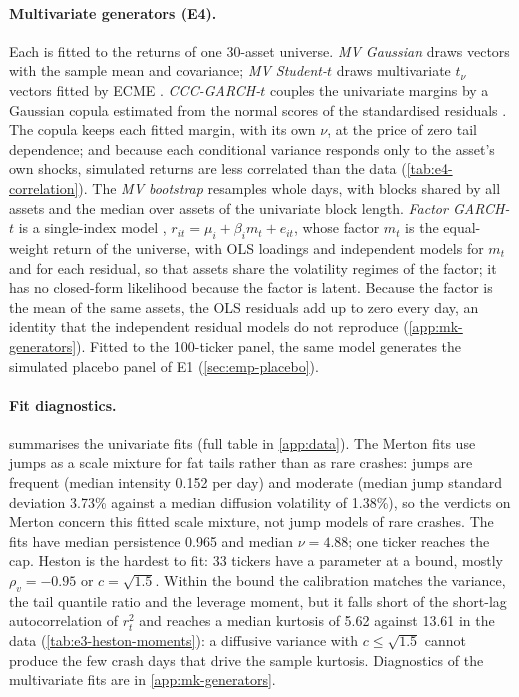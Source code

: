 \paragraph{Multivariate generators (E4).}
Each is fitted to the \TRAIN{} returns of one 30-asset universe. \emph{MV Gaussian} draws \iid{}
vectors with the sample mean and covariance; \emph{MV Student-$t$} draws \iid{} multivariate
$t_\nu$ vectors fitted by ECME \citep{liu1995ml}. \emph{CCC-GARCH-$t$}
\citep{bollerslev1990modelling} couples the univariate \GARCHt{} margins by a Gaussian copula
estimated from the normal scores of the standardised residuals \citep{joe2005asymptotic}. The
copula keeps each fitted margin, with its own $\nu$, at the price of zero tail dependence; and
because each conditional variance responds only to the asset's own shocks, simulated returns are
less correlated than the data (\cref{tab:e4-correlation}). The \emph{MV bootstrap} resamples
whole \TRAIN{} days, with blocks shared by all assets and the median over assets of the
univariate block length. \emph{Factor GARCH-$t$} is a single-index model
\citep{sharpe_1963_simplified,engle_1990_asset}, $r_{it}=\mu_i+\beta_im_t+e_{it}$, whose factor
$m_t$ is the equal-weight return of the universe, with OLS loadings and independent \GARCHt{}
models for $m_t$ and for each residual, so that assets share the volatility regimes of the
factor; it has no closed-form likelihood because the factor is latent. Because the factor is the
mean of the same assets, the OLS residuals add up to zero every day, an identity that the
independent residual models do not reproduce (\cref{app:mk-generators}). Fitted to the 100-ticker
panel, the same model generates the simulated placebo panel of E1 (\cref{sec:emp-placebo}).

\paragraph{Fit diagnostics.}
 summarises the univariate fits (full table in \cref{app:data}).
The Merton fits use jumps as a scale mixture for fat tails rather than as rare crashes: jumps are
frequent (median intensity 0.152 per day) and moderate (median jump standard deviation 3.73\%
against a median diffusion volatility of 1.38\%), so the verdicts on Merton concern this fitted
scale mixture, not jump models of rare crashes. The \GARCHt{} fits have median persistence 0.965 and
median $\nu=4.88$; one ticker reaches the cap. Heston is the hardest to fit: 33 tickers have a
parameter at a bound, mostly $\rho_v=-0.95$ or $c=\sqrt{1.5}$. Within the bound the calibration
matches the variance, the tail quantile ratio and the leverage moment, but it falls short of the
short-lag autocorrelation of $r_t^2$ and reaches a median kurtosis of 5.62 against 13.61 in the
data (\cref{tab:e3-heston-moments}): a diffusive variance with $c\le\sqrt{1.5}$ cannot produce
the few crash days that drive the sample kurtosis. Diagnostics of the multivariate fits are in
\cref{app:mk-generators}.

